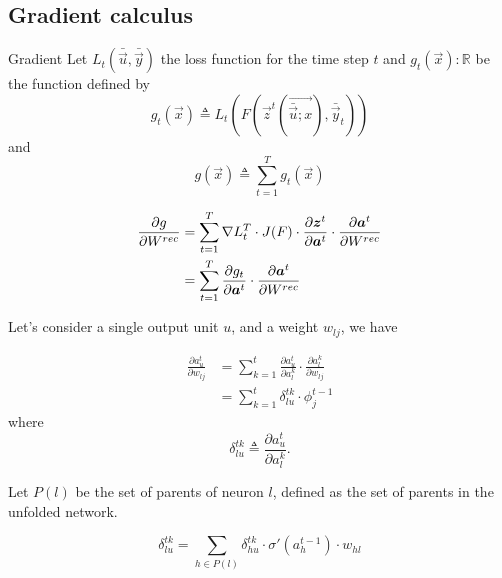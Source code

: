 \subsection{Gradient calculus}
\begin{frame}{Gradient}
	Let $L_t(\bar{\vec{u}}, \bar{\vec{y}})$ the loss function for the time step $t$ and  $g_t(\vec{x}): \mathbb{R}$ be the function defined by
	$$g_t(\vec{x}) \triangleq L_t(F(\vec{z}^t(\vec{\bar{\vec{u}};x}),\bar{\vec{y}}_t ))$$
	and $$g(\vec{x}) \triangleq \sum_{t=1}^T g_t(\vec{x})$$
	
	
	\begin{align}
	\frac{\partial g}{\partial W^{rec}} &= \sum_{t=1}^T \nabla L_t^T \cdot J(F) \cdot \frac{\partial \boldsymbol{z}^t}{\partial \boldsymbol{a}^t} \cdot \frac{\partial \boldsymbol{a}^t}{\partial W^{rec}}\\
	&= \sum_{t=1}^T\frac{\partial g_t}{\partial \boldsymbol{a}^t} \cdot \frac{\partial \boldsymbol{a}^t}{\partial W^{rec}}
	\end{align}
\end{frame}
\begin{frame}
	
	Let's consider a single output unit $u$, and a weight $w_{lj}$, we have
	
	\begin{align}
	\label{sum_over_time}
	\frac{\partial a^t_u}{\partial w_{lj}} &= \sum_{k=1}^t \frac{\partial a_u^t}{\partial a^k_l} \cdot \frac{\partial a^k_l}{\partial w_{lj}}\\
	&= \sum_{k=1}^t \delta^{tk}_{lu} \cdot \phi_j^{t-1}
	\end{align}
	where
	\begin{equation}
	\delta_{lu}^{tk} \triangleq \frac{\partial a_u^t}{\partial a^k_l}.
	\end{equation}
	
	Let $P(l)$ be the set of parents of neuron $l$, defined as the set of parents in the unfolded network.
	
	\begin{equation}
	\delta_{lu}^{tk} = \sum_{h\in P(l)} \delta_{hu}^{tk} \cdot \sigma'(a_h^{t-1})\cdot w_{hl}
	\end{equation}
\end{frame}
